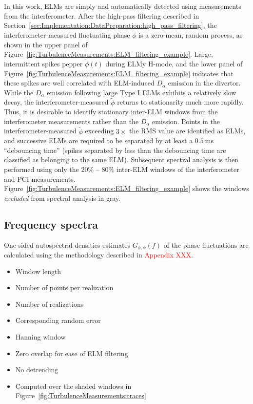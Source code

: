 In this work, ELMs are simply and automatically detected
using measurements from the interferometer.
After the high-pass filtering described in
Section~\ref{sec:Implementation:DataPreparation:high_pass_filtering},
the interferometer-measured fluctuating phase $\tilde{\phi}$
is a zero-mean, random process,
as shown in the upper panel of
Figure~\ref{fig:TurbulenceMeasurements:ELM_filtering_example}.
Large, intermittent spikes pepper $\tilde{\phi}(t)$ during ELMy H-mode, and
the lower panel of
Figure~\ref{fig:TurbulenceMeasurements:ELM_filtering_example}
indicates that these spikes are well correlated
with ELM-induced $D_{\alpha}$ emission in the divertor.
While the $D_{\alpha}$ emission following large Type I ELMs
exhibits a relatively slow decay,
the interferometer-measured $\tilde{\phi}$
returns to stationarity much more rapidly.
Thus, it is desirable to identify
stationary inter-ELM windows
from the interferometer measurements
rather than the $D_{\alpha}$ emission.
Points in the interferometer-measured $\tilde{\phi}$
exceeding $3 \times$ the RMS value
are identified as ELMs, and
successive ELMs are required to be separated
by at least a $\SI{0.5}{\milli\second}$ ``debouncing time''
(spikes separated by less than the debouncing time
are classified as belonging to the same ELM).
Subsequent spectral analysis is then performed
using only the $20\%$ -- $80\%$ inter-ELM windows
of the interferometer and PCI measurements.
Figure~\ref{fig:TurbulenceMeasurements:ELM_filtering_example}
shows the windows \emph{excluded} from spectral analysis in gray.


\subsection{Frequency spectra}
One-sided autospectral densities estimates $G_{\phi,\phi}(f)$
of the phase fluctuations
are calculated using the methodology
described in \textcolor{red}{Appendix XXX}.
\begin{itemize}
  \item Window length
  \item Number of points per realization
  \item Number of realizations
  \item Corresponding random error
  \item Hanning window
  \item Zero overlap for ease of ELM filtering
  \item No detrending
  \item Computed over the shaded windows
    in Figure~\ref{fig:TurbulenceMeasurements:traces}
\end{itemize}

